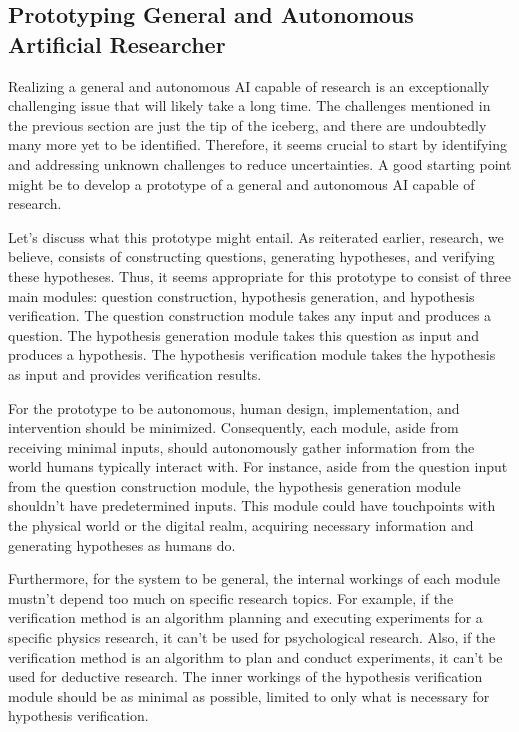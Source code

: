 \subsection{Prototyping General and Autonomous Artificial Researcher}

Realizing a general and autonomous AI capable of research is an exceptionally challenging issue that will likely take a long time. The challenges mentioned in the previous section are just the tip of the iceberg, and there are undoubtedly many more yet to be identified. Therefore, it seems crucial to start by identifying and addressing unknown challenges to reduce uncertainties. A good starting point might be to develop a prototype of a general and autonomous AI capable of research.

Let's discuss what this prototype might entail. As reiterated earlier, research, we believe, consists of constructing questions, generating hypotheses, and verifying these hypotheses. Thus, it seems appropriate for this prototype to consist of three main modules: question construction, hypothesis generation, and hypothesis verification. The question construction module takes any input and produces a question. The hypothesis generation module takes this question as input and produces a hypothesis. The hypothesis verification module takes the hypothesis as input and provides verification results.

For the prototype to be autonomous, human design, implementation, and intervention should be minimized. Consequently, each module, aside from receiving minimal inputs, should autonomously gather information from the world humans typically interact with. For instance, aside from the question input from the question construction module, the hypothesis generation module shouldn't have predetermined inputs. This module could have touchpoints with the physical world or the digital realm, acquiring necessary information and generating hypotheses as humans do.

Furthermore, for the system to be general, the internal workings of each module mustn't depend too much on specific research topics. For example, if the verification method is an algorithm planning and executing experiments for a specific physics research, it can't be used for psychological research. Also, if the verification method is an algorithm to plan and conduct experiments, it can't be used for deductive research. The inner workings of the hypothesis verification module should be as minimal as possible, limited to only what is necessary for hypothesis verification. 


